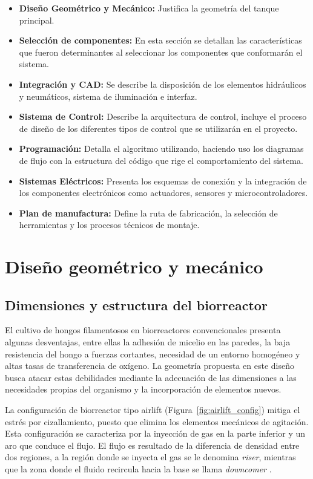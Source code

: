 \documentclass[11pt,tesis,twoside,openright,spanish]{upiiztt}
\begin{document}
\begin{itemize}
  \item \textbf{Diseño Geométrico y Mecánico:} Justifica la geometría del tanque principal.
  \item \textbf{Selección de componentes:} En esta sección se detallan las características que fueron determinantes al seleccionar los componentes que conformarán el sistema.
  \item \textbf{Integración y CAD:} Se describe la disposición de los elementos hidráulicos y neumáticos, sistema de iluminación e interfaz.
  \item \textbf{Sistema de Control:} Describe la arquitectura de control, incluye el proceso de diseño de los diferentes tipos de control que se utilizarán en el proyecto.
  \item \textbf{Programación:} Detalla el algoritmo utilizando, haciendo uso los diagramas de flujo con la estructura del código que rige el comportamiento del sistema.
  \item \textbf{Sistemas Eléctricos:} Presenta los esquemas de conexión y la integración de los componentes electrónicos como actuadores, sensores y microcontroladores.
  \item \textbf{Plan de manufactura:} Define la ruta de fabricación, la selección de herramientas y los procesos técnicos de montaje.
\end{itemize}

\section{Diseño geométrico y mecánico}

\subsection{Dimensiones y estructura del biorreactor}

El cultivo de hongos filamentosos en biorreactores convencionales presenta
algunas desventajas, entre ellas la adhesión de micelio en las paredes, la baja
resistencia del hongo a fuerzas cortantes, necesidad de un entorno homogéneo y
altas tasas de transferencia de oxígeno. La geometría propuesta en este diseño
busca atacar estas debilidades mediante la adecuación de las dimensiones a las
necesidades propias del organismo y la incorporación de elementos nuevos.

La configuración de biorreactor tipo airlift (Figura~\ref{fig:airlift_config}) mitiga el estrés por
cizallamiento, puesto que elimina los elementos mecánicos de agitación. Esta
configuración se caracteriza por la inyección de gas en la parte inferior y un aro que
conduce el flujo. El flujo es resultado de la diferencia de densidad entre dos
regiones, a la región donde se inyecta el gas se le denomina \textit{riser}, mientras que la
zona donde el fluido recircula hacia la base se llama \textit{downcomer} \cite{Cerrone2024}.
\end{document}
